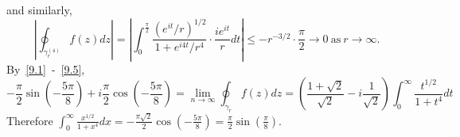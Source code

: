 \documentclass[12pt]{article}
\begin{document}
and similarly,
\begin{equation}
\left|\oint_{\gamma_{r}^{(4)}}f(z)dz\right| = \left|\int_{0}^{\frac{\pi}{2}}\frac{(e^{it}/r)^{1/2}}{1 + e^{i4t}/r^{4}}\cdot \frac{ie^{it}}{r}dt\right|
\leq -r^{-3/2} \cdot \frac{\pi}{2} \rightarrow 0 \ \text{as}\  r\rightarrow \infty.
\label{9.5}
\end{equation}
By~\eqref{9.1}~-~\eqref{9.5},
\[ -\frac{\pi}{2}\sin\left( -\frac{5\pi}{8} \right) + i\frac{\pi}{2}\cos\left( -\frac{5\pi}{8} \right) =
\lim_{n\rightarrow \infty}\oint_{\gamma_{r}}f(z)dz =
\left(\frac{1 + \sqrt{2}}{\sqrt{2}} -i\frac{1}{\sqrt{2}}\right)\int_{0}^{\infty}\frac{t^{1/2}}{1 + t^{4}}dt \]
Therefore $\int_{0}^{\infty}\frac{x^{1/2}}{1 + x^{4}}dx = - \frac{\pi\sqrt{2}}{2} \cos \left( -\frac{5\pi}{8} \right) = \frac{\pi}{2} \sin\left( \frac{\pi}{8} \right)$.



\newpage
\end{document}
